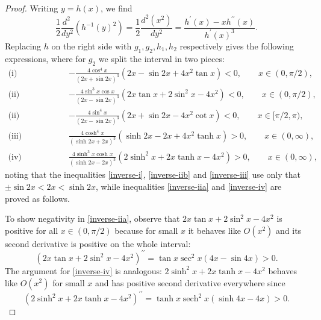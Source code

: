 \documentclass[12pt,reqno]{amsart}
\theoremstyle{definition}
\newcommand{\sech}{\operatorname{sech}}
\begin{document}
\begin{proof}
Writing $y=h(x)$, we find
\[
\frac{1}{2} \frac{d^2\ }{dy^2} \left( h^{-1}(y)^2 \right) = \frac{1}{2} \frac{d^2(x^2)}{dy^2} = \frac{h^\prime(x) - x h^{\prime \prime}(x)}{h^\prime(x)^3} .
\]
Replacing $h$ on the right side with $g_1,g_2,h_1,h_2$ respectively gives the following expressions, where for $g_2$ we split the interval in two pieces:
%
\begin{align}
\text{(i)} \hspace{2cm} & -\frac{4\cos^4 x}{(2x+\sin 2x)^3} (2x - \sin 2x + 4 x^2 \tan x) < 0 , \qquad x \in (0,\pi/2) , \label{inverse-i} \\
\text{(ii)} \hspace{2cm} & -\frac{4\sin^3 x \cos x}{(2x-\sin 2x)^3} (2x \tan x  + 2\sin^2 x - 4 x^2) < 0 , \qquad x \in (0,\pi/2) , \label{inverse-iia} \\
\text{(ii)} \hspace{2cm} & -\frac{4\sin^4 x}{(2x-\sin 2x)^3} (2x + \sin 2x - 4 x^2 \cot x) < 0 , \qquad x \in [\pi/2,\pi) , \label{inverse-iib} \\
\text{(iii)} \hspace{2cm} & \frac{4\cosh^4 x}{(\sinh 2x +  2x)^3} (\sinh 2x - 2x + 4 x^2 \tanh x) > 0 , \qquad x \in (0,\infty) , \label{inverse-iii} \\
\text{(iv)} \hspace{2cm} & \frac{4\sinh^3 x \cosh x}{(\sinh 2x - 2x)^3} (2\sinh^2 x + 2x \tanh x - 4 x^2) > 0 , \qquad x \in (0,\infty) , \label{inverse-iv} 
\end{align}
%
noting that the inequalities \eqref{inverse-i}, \eqref{inverse-iib} and \eqref{inverse-iii} use only that $\pm \sin 2x < 2x < \sinh 2x$, while inequalities \eqref{inverse-iia} and \eqref{inverse-iv} are proved as follows. 

To show negativity in \eqref{inverse-iia}, observe that $2x \tan x  + 2\sin^2 x - 4 x^2$ is positive for all $x \in (0,\pi/2)$ because for small $x$ it behaves like $O(x^2)$ and its second derivative is positive on the whole interval: 
\[
(2x \tan x + 2\sin^2 x - 4 x^2)^{\prime \prime} = \tan x \sec^2 x (4x-\sin 4x) > 0 .
\]
The argument for \eqref{inverse-iv} is analogous: $2\sinh^2 x + 2x \tanh x - 4 x^2$ behaves like  $O(x^2)$ for small $x$ and has positive second derivative everywhere since 
\[
(2\sinh^2 x + 2x \tanh x - 4 x^2)^{\prime \prime} = \tanh x \sech^2 x (\sinh 4x - 4x) > 0 .
\]
\end{proof}
%
\end{document}

